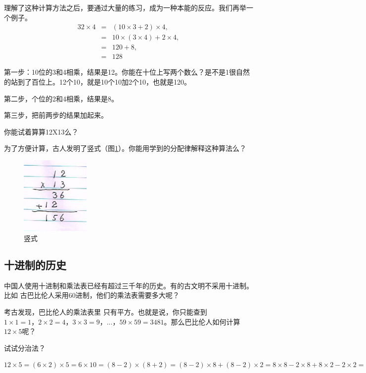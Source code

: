   理解了这种计算方法之后，要通过大量的练习，成为一种本能的反应。我们再举一个例子。
  \begin{eqnarray}
  32\times4 &=& (10\times3 + 2)\times4,\\
  &=& 10\times(3\times4) + 2\times4,\\
  &=& 120 + 8 ,\\
  &=& 128
  \end{eqnarray}

  第一步：10位的3和4相乘，结果是12。你能在十位上写两个数么？是不是1很自然	的站到了百位上。12个10，就是10个10加2个10，也就是120。

  第二步，个位的2和4相乘，结果是8。

  第三步，把前两步的结果加起来。

  你能试着算算12X13么？

  为了方便计算，古人发明了竖式（图\ref{img_shushi}）。你能用学到的分配律解释这种算法么？
  
  \begin{figure}[h]
       \center
       \includegraphics[width=0.3\textwidth]{multiplication_res/shushi}
       \caption{竖式}
       \label{img_shushi}
  \end{figure}
\subsection{十进制的历史}
中国人使用十进制和乘法表已经有超过三千年的历史。有的古文明不采用十进制。比如	古巴比伦人采用60进制，他们的乘法表需要多大呢？

考古发现，巴比伦人的乘法表里	只有平方。也就是说，你只能查到$1\times1=1，2\times2=4，3\times3=9，...，59\times59=3481$。那么巴比伦人如何计算$12\times5$呢？

试试分治法？

$12\times5=(6\times2)\times5 = 6\times10 = (8-2)\times(8+2) = (8-2)\times8 + (8-2)\times2 = 8\times8-2\times8+8\times2-2\times2  = 64 - 4 = 60$


